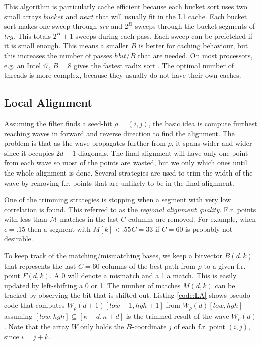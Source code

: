 \documentclass[../main/thesis.tex]{subfiles}
\begin{document}


This algorithm is particularly cache efficient because each bucket sort uses two small arrays $bucket$ and $next$ that will usually fit in the L1 cache.
Each bucket sort makes one sweep through $src$ and $2^B$ sweeps through the bucket segments of $trg$.
This totals $2^B+1$ sweeps during each pass.
Each sweep can be prefetched if it is small enough.
This means a smaller $B$ is better for caching behaviour, but this increases the number of passes $hbit/B$ that are needed.
On most processors, e.g. an Intel i7, $B = 8$ gives the fastest radix sort \cite{Daligner}.
The optimal number of threads is more complex, because they usually do not have their own caches.



\subsection{Local Alignment}
Assuming the filter finds a seed-hit $\rho = (i,j)$, the basic idea is compute furthest reaching waves in forward and reverse direction to find the alignment.
The problem is that as the wave propagates further from $\rho$, it spans wider and wider since it occupies $2d+1$ diagonals.
The final alignment will have only one point from each wave so most of the points are wasted, but we only which ones until the whole alignment is done.
Several strategies are used to trim the width of the wave by removing f.r. points that are unlikely to be in the final alignment.

One of the trimming strategies is stopping when a segment with very low correlation is found.
This referred to as the \textit{regional alignment quality}.
F.r. points with less than $\mathcal{M}$ matches in the last $C$ columns are removed.
For example, when $\epsilon = .15$ then a segment with $M[k] < .55C = 33$ if $C = 60$ is probably not desirable.

To keep track of the matching/mismatching bases, we keep a bitvector $B(d,k)$ that represents the last $C = 60$ columns of the best path from $\rho$ to a given f.r. point $F(d,k)$.
A 0 will denote a mismatch and a 1 a match.
This is easily updated by left-shifting a 0 or 1.
The number of matches $M(d,k)$ can be tracked by observing the bit that is shifted out.
Listing \ref{code:LA} shows pseudo-code that computes $W_\rho(d+1)[low-1,hgh+1]$ from $W_\rho(d)[low,hgh]$ assuming $[low,hgh] \subseteq [\kappa-d,\kappa+d]$ is the trimmed result of the wave $W_\rho(d)$.
Note that the array $W$ only holds the $B$-coordinate $j$ of each f.r. point $(i,j)$, since $i = j + k$.
\end{document}
